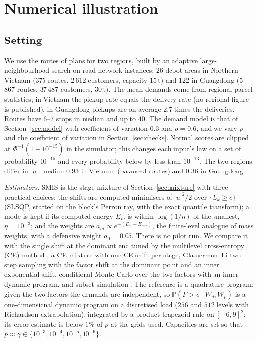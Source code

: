 \documentclass[pdflatex,sn-mathphys-ay]{sn-jnl}%
\theoremstyle{thmstyleone}%
\theoremstyle{thmstylethree}%
\theoremstyle{thmstyletwo}%
\renewcommand{\P}{\mathbb{P}}
\begin{document}
\section{Numerical illustration}
\label{sec:numerics}

\subsection{Setting}
We use the routes of plans for two regions, built by an adaptive large-neighbourhood
search on road-network instances: 26 depot areas in Northern Vietnam (375 routes, 2\,612
customers, capacity $15$\,t) and 122 in Guangdong (5\,867 routes, 37\,487 customers,
$30$\,t). The mean demands come from regional parcel statistics; in Vietnam the pickup
rate equals the delivery rate (no regional figure is published), in Guangdong pickups
are on average $2.7$ times the deliveries. Routes have $6$--$7$ stops in median and up to
$40$. The demand model is that of Section~\ref{sec:model} with coefficient of variation
$0.3$ and $\rho=0.6$, and we vary $\rho$ and the coefficient of variation in
Section~\ref{sec:checks}. Normal scores are clipped at $\Phi^{-1}(1-10^{-15})$ in the
simulator; this changes each input's law on a set of probability $10^{-15}$ and every
probability below by less than $10^{-13}$. The two regions differ in $\varrho$:
median $0.93$ in Vietnam (balanced routes) and $0.36$ in Guangdong.

\emph{Estimators.} SMIS is the stage mixture of Section~\ref{sec:mixture} with three
practical choices: the shifts are computed minimisers of $|u|^2/2$ over $\{L_k\ge c\}$
(SLSQP, started on the block's Perron ray, with the exact quantile transform); a mode is
kept if its computed energy $E_m$ is within $\log(1/\eta)$ of the smallest,
$\eta=10^{-3}$; and the weights are $a_m\propto e^{-(E_m-E_{\min})}$, the finite-level
analogue of mass weights, with a defensive weight $a_0=0.05$. There is no pilot run. We
compare it with the single shift at the dominant end tuned by the multilevel
cross-entropy (CE) method \citep{deBoerEtAl2005}, a CE mixture with one CE shift per
stage, Glasserman--Li two-step sampling \citep{GlassermanLi2005} with the factor shift at
the dominant point and an inner exponential shift, conditional Monte Carlo over the two
factors with an inner dynamic program, and subset simulation \citep{AuBeck2001}. The
reference is a quadrature program: given the two factors the demands are independent,
so $\P(F>c\mid W_d,W_p)$ is a one-dimensional dynamic program on a discretised load
($256$ and $512$ levels with Richardson extrapolation), integrated by a product
trapezoid rule on $[-6,9]^2$; its error estimate is below $1\%$ of $p$ at the grids used.
Capacities are set so that $p\approx\gamma\in\{10^{-3},10^{-4},10^{-5},10^{-6}\}$.
\end{document}
